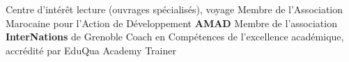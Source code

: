 \begin{rubric}{Centre d’intérêt}
\entry*[] lecture (ouvrages spécialisés), voyage
\entry*[] Membre de l’Association Marocaine pour l’Action de Développement \textbf{AMAD}
\entry*[] Membre de l’association \textbf{InterNations} de Grenoble
\entry*[] Coach en Compétences de l'excellence académique, accrédité par EduQua Academy Trainer
\end{rubric}

